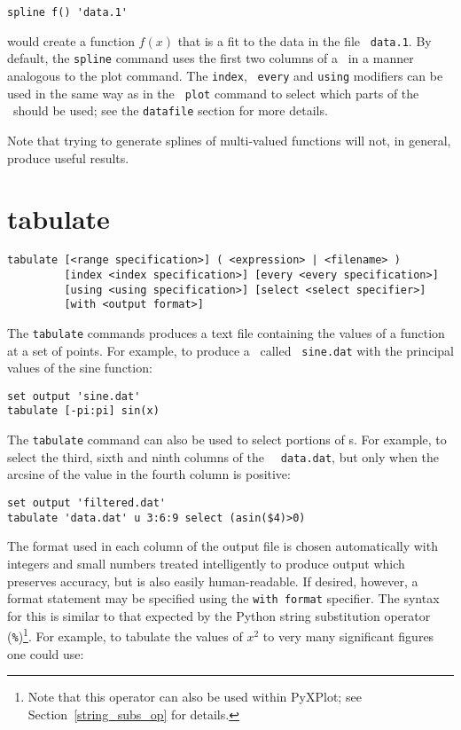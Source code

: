 \begin{verbatim}
spline f() 'data.1'
\end{verbatim}

\noindent would create a function $f(x)$ that is a fit to the data in the file {\tt
data.1}. By default, the {\tt spline} command uses the first two columns of a
\datafile\ in a manner analogous to the plot command. The {\tt index}, {\tt
every} and {\tt using} modifiers can be used in the same way as in the {\tt
plot} command to select which parts of the \datafile\ should be used; see the
{\tt datafile} section for more details.

Note that trying to generate splines of multi-valued functions will not, in
general, produce useful results.

\section{tabulate}

\begin{verbatim}
tabulate [<range specification>] ( <expression> | <filename> )
         [index <index specification>] [every <every specification>]
         [using <using specification>] [select <select specifier>]
         [with <output format>]
\end{verbatim}

The {\tt tabulate} commands produces a text file containing the values of a
function at a set of points.  For example, to produce a \datafile\ called {\tt
sine.dat} with the principal values of the sine function:

\begin{verbatim}
set output 'sine.dat'
tabulate [-pi:pi] sin(x)
\end{verbatim}

The {\tt tabulate} command can also be used to select portions of \datafile s.
For example, to select the third, sixth and ninth columns of the \datafile\ {\tt
data.dat}, but only when the arcsine of the value in the fourth column is
positive:

\begin{verbatim}
set output 'filtered.dat'
tabulate 'data.dat' u 3:6:9 select (asin($4)>0)
\end{verbatim}

The format used in each column of the output file is chosen automatically with
integers and small numbers treated intelligently to produce output which
preserves accuracy, but is also easily human-readable. If desired, however, a
format statement may be specified using the {\tt with format} specifier. The
syntax for this is similar to that expected by the Python string substitution
operator ({\tt \%})\footnote{Note that this operator can also be used
within PyXPlot; see Section~\ref{string_subs_op} for details.}.  For example,
to tabulate the values of $x^2$ to very many significant figures one could use:

